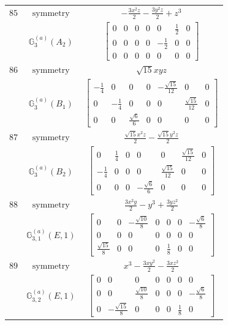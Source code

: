\documentclass[fleqn,8pt,landscape]{jsarticle}
\begin{document}
\begin{longtable}{ccc}
$ 85 $ & $ \text{symmetry} $ & $ - \frac{3 x^{2} z}{2} - \frac{3 y^{2} z}{2} + z^{3} $ \\
$  $ & $ \mathbb{G}_{3}^{(a)}(A_{2}) $ & $ \begin{bmatrix} 0 & 0 & 0 & 0 & 0 & \frac{1}{2} & 0 \\ 0 & 0 & 0 & 0 & - \frac{1}{2} & 0 & 0 \\ 0 & 0 & 0 & 0 & 0 & 0 & 0 \end{bmatrix} $ \\ \hline
$ 86 $ & $ \text{symmetry} $ & $ \sqrt{15} x y z $ \\
$  $ & $ \mathbb{G}_{3}^{(a)}(B_{1}) $ & $ \begin{bmatrix} - \frac{1}{4} & 0 & 0 & 0 & - \frac{\sqrt{15}}{12} & 0 & 0 \\ 0 & - \frac{1}{4} & 0 & 0 & 0 & \frac{\sqrt{15}}{12} & 0 \\ 0 & 0 & \frac{\sqrt{6}}{6} & 0 & 0 & 0 & 0 \end{bmatrix} $ \\ \hline
$ 87 $ & $ \text{symmetry} $ & $ \frac{\sqrt{15} x^{2} z}{2} - \frac{\sqrt{15} y^{2} z}{2} $ \\
$  $ & $ \mathbb{G}_{3}^{(a)}(B_{2}) $ & $ \begin{bmatrix} 0 & \frac{1}{4} & 0 & 0 & 0 & \frac{\sqrt{15}}{12} & 0 \\ - \frac{1}{4} & 0 & 0 & 0 & \frac{\sqrt{15}}{12} & 0 & 0 \\ 0 & 0 & 0 & - \frac{\sqrt{6}}{6} & 0 & 0 & 0 \end{bmatrix} $ \\ \hline
$ 88 $ & $ \text{symmetry} $ & $ \frac{3 x^{2} y}{2} - y^{3} + \frac{3 y z^{2}}{2} $ \\
$  $ & $ \mathbb{G}_{3,1}^{(a)}(E,1) $ & $ \begin{bmatrix} 0 & 0 & - \frac{\sqrt{10}}{8} & 0 & 0 & 0 & - \frac{\sqrt{6}}{8} \\ 0 & 0 & 0 & 0 & 0 & 0 & 0 \\ \frac{\sqrt{15}}{8} & 0 & 0 & 0 & \frac{1}{8} & 0 & 0 \end{bmatrix} $ \\ \hline
$ 89 $ & $ \text{symmetry} $ & $ x^{3} - \frac{3 x y^{2}}{2} - \frac{3 x z^{2}}{2} $ \\
$  $ & $ \mathbb{G}_{3,2}^{(a)}(E,1) $ & $ \begin{bmatrix} 0 & 0 & 0 & 0 & 0 & 0 & 0 \\ 0 & 0 & \frac{\sqrt{10}}{8} & 0 & 0 & 0 & - \frac{\sqrt{6}}{8} \\ 0 & - \frac{\sqrt{15}}{8} & 0 & 0 & 0 & \frac{1}{8} & 0 \end{bmatrix} $ \\ \hline

\end{longtable}
\end{document}
